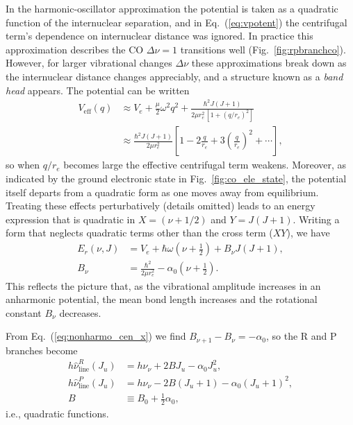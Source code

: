 In the harmonic-oscillator approximation the potential is taken as a quadratic function of the internuclear separation, and in Eq.~(\ref{eq:vpotent}) the centrifugal term’s dependence on internuclear distance was ignored. In practice this approximation describes the CO $\Delta \nu=1$ transitions well (Fig.~\ref{fig:rpbranchco}). However, for larger vibrational changes $\Delta \nu$ these approximations break down as the internuclear distance changes appreciably, and a structure known as a \emph{band head} appears. The potential can be written
\begin{align}
\label{eq:vpotent_}
V_\mathrm{eff} (q) &\approx V_e + \frac{\mu}{2} \omega^2 q^2 + \frac{\hbar^2 J(J+1)}{2 \mu r_e^2 \,[1 + (q/r_e)^2]} \\
&\approx \frac{\hbar^2 J (J+1)}{2 \mu r_e^2} \left[1 - 2 \frac{q}{r_e} + 3 \left(\frac{q}{r_e} \right)^2 + \cdots \right],
\end{align}
so when $q/r_e$ becomes large the effective centrifugal term weakens. Moreover, as indicated by the ground electronic state in Fig.~\ref{fig:co_ele_state}, the potential itself departs from a quadratic form as one moves away from equilibrium. Treating these effects perturbatively (details omitted) leads to an energy expression that is quadratic in $X=(\nu + 1/2)$ and $Y=J(J+1)$. Writing a form that neglects quadratic terms other than the cross term ($XY$), we have
\begin{align}
\label{eq:nonharmo_cen}
E_r (\nu, J) &= V_e + \hbar \omega \left( \nu + \frac{1}{2} \right) + B_\nu J (J+1), \\
\label{eq:nonharmo_cen_x}
B_\nu &= \frac{\hbar^2}{2 \mu r_e^2} - \alpha_0  \left( \nu + \frac{1}{2} \right).
\end{align}
This reflects the picture that, as the vibrational amplitude increases in an anharmonic potential, the mean bond length increases and the rotational constant $B_\nu$ decreases.

From Eq.~(\ref{eq:nonharmo_cen_x}) we find $B_{\nu+1} - B_\nu = - \alpha_0$, so the R and P branches become
\begin{align}
\label{eq:u_fort_R}
h \hat{\nu}^R_{\mathrm{line}} (J_u) &= h \nu_\nu  + 2 B J_u - \alpha_0 J_u^2, \\
\label{eq:u_fort_P}
h \hat{\nu}^P_{\mathrm{line}} (J_u) &=  h \nu_\nu - 2 B (J_u + 1) - \alpha_0 (J_u + 1)^2, \\
B &\equiv B_0 + \frac{1}{2} \alpha_0,
\end{align}
i.e., quadratic functions.

